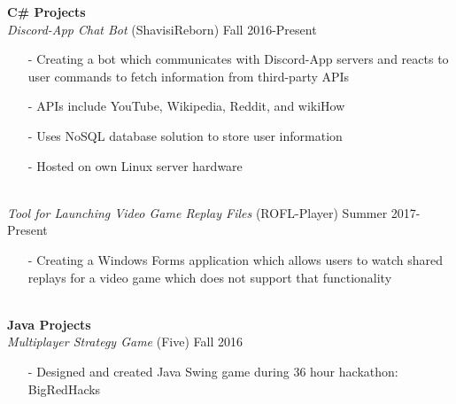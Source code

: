 \documentclass[10pt]{article}
\newcommand{\Indent}{\indent\indent}
\begin{document}
        \indent \small\textbf{C\# Projects}\\
            \Indent \small\textit{Discord-App Chat Bot}\small{ (ShavisiReborn)} \hfill \small{Fall 2016-Present}\indent\\
                \Indent\begin{minipage}{\dimexpr\textwidth-6cm}
                    \begin{itemize}[noitemsep, topsep=0pt]
                        \item[-] Creating a bot which communicates with Discord-App servers and reacts to user commands to fetch information from third-party APIs
                        \item[-] APIs include YouTube, Wikipedia, Reddit, and wikiHow
                        \item[-] Uses NoSQL database solution to store user information
                        \item[-] Hosted on own Linux server hardware
                    \end{itemize}\vspace{0mm}
                \end{minipage}\\
            \Indent \small\textit{Tool for Launching Video Game Replay Files}\small{ (ROFL-Player)} \hfill \small{Summer 2017-Present}\indent\vspace{0.5mm}\\
                \Indent\begin{minipage}{\dimexpr\textwidth-6cm}
                    \begin{itemize}[noitemsep, topsep=0pt]
                        \item[-] Creating a Windows Forms application which allows users to watch shared replays for a video game which does not support that functionality
                    \end{itemize}\vspace{0mm}
                \end{minipage}\\
        \indent \small\textbf{Java Projects}\\
            \Indent \small\textit{Multiplayer Strategy Game}\small{ (Five)} \hfill \small{Fall 2016}\indent\vspace{0.5mm}\\
                \Indent\begin{minipage}{\dimexpr\textwidth-6cm}
                    \begin{itemize}[noitemsep, topsep=0pt]
                        \item[-] Designed and created Java Swing game during 36 hour hackathon: BigRedHacks
                    \end{itemize}\vspace{0mm}
                \end{minipage}\\
\end{document}
